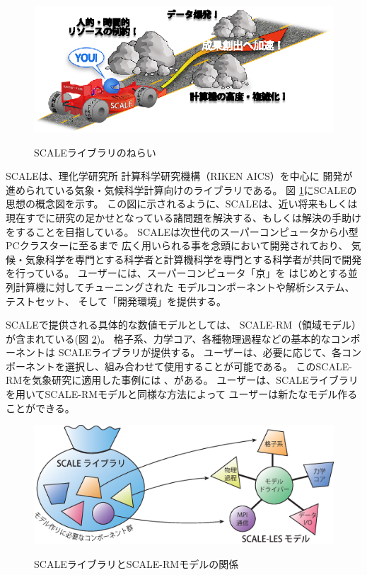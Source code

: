 \begin{figure}[bh]
\begin{center}
  \includegraphics[width=0.9\hsize]{./figure/library.eps}\\
  \caption{SCALEライブラリのねらい}
  \label{fig:scale}
\end{center}
\end{figure}

SCALEは、理化学研究所 計算科学研究機構（RIKEN AICS）を中心に
開発が進められている気象・気候科学計算向けのライブラリである。
図 \ref{fig:scale}にSCALEの思想の概念図を示す。
この図に示されるように、SCALEは、近い将来もしくは
現在すでに研究の足かせとなっている諸問題を解決する、もしくは解決の手助けをすることを目指している。
SCALEは次世代のスーパーコンピュータから小型PCクラスターに至るまで
広く用いられる事を念頭において開発されており、
気候・気象科学を専門とする科学者と計算機科学を専門とする科学者が共同で開発を行っている。
ユーザーには、スーパーコンピュータ「京」を
はじめとする並列計算機に対してチューニングされた
モデルコンポーネントや解析システム、テストセット、
そして「開発環境」を提供する。

SCALEで提供される具体的な数値モデルとしては、
SCALE-RM（領域モデル）が含まれている(図 \ref{fig:scale-rm})。
格子系、力学コア、各種物理過程などの基本的なコンポーネントは
SCALEライブラリが提供する。
ユーザーは、必要に応じて、各コンポーネントを選択し、組み合わせて使用することが可能である。
このSCALE-RMを気象研究に適用した事例には
\cite{satoy_2014}、\cite{satoy_2015}がある。
ユーザーは、SCALEライブラリを用いてSCALE-RMモデルと同様な方法によって
ユーザーは新たなモデル作ることができる。


\begin{figure}[tb]
\begin{center}
  \includegraphics[width=0.9\hsize]{./figure/scale.eps}\\
  \caption{SCALEライブラリとSCALE-RMモデルの関係}
  \label{fig:scale-rm}
\end{center}
\end{figure}


